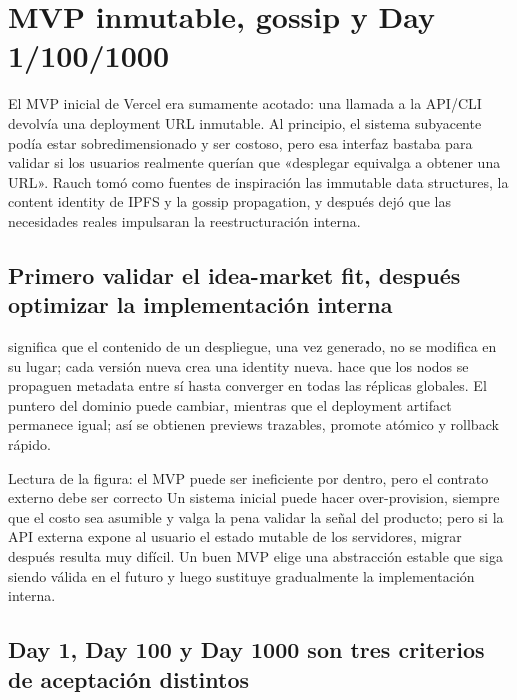 \section{MVP inmutable, gossip y Day 1/100/1000}

El MVP inicial de Vercel era sumamente acotado: una llamada a la API/CLI devolvía una deployment URL inmutable. Al principio, el sistema subyacente podía estar sobredimensionado y ser costoso, pero esa interfaz bastaba para validar si los usuarios realmente querían que «desplegar equivalga a obtener una URL». Rauch tomó como fuentes de inspiración las immutable data structures, la content identity de IPFS y la gossip propagation, y después dejó que las necesidades reales impulsaran la reestructuración interna.

\subsection{Primero validar el idea-market fit, después optimizar la implementación interna}

 significa que el contenido de un despliegue, una vez generado, no se modifica en su lugar; cada versión nueva crea una identity nueva.  hace que los nodos se propaguen metadata entre sí hasta converger en todas las réplicas globales. El puntero del dominio puede cambiar, mientras que el deployment artifact permanece igual; así se obtienen previews trazables, promote atómico y rollback rápido.


\begin{knowledgebox}{Lectura de la figura: el MVP puede ser ineficiente por dentro, pero el contrato externo debe ser correcto}
Un sistema inicial puede hacer over-provision, siempre que el costo sea asumible y valga la pena validar la señal del producto; pero si la API externa expone al usuario el estado mutable de los servidores, migrar después resulta muy difícil. Un buen MVP elige una abstracción estable que siga siendo válida en el futuro y luego sustituye gradualmente la implementación interna.
\end{knowledgebox}

\subsection{Day 1, Day 100 y Day 1000 son tres criterios de aceptación distintos}

